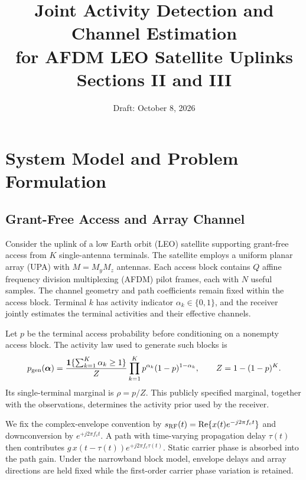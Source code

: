 \documentclass[10pt,a4paper]{article}
\title{Joint Activity Detection and Channel Estimation\protect\\
for AFDM LEO Satellite Uplinks\protect\\[5pt]
\large Sections II and III}
\author{}
\date{Draft: October 8, 2026}
\newcommand{\relu}{\operatorname{Re}}
\begin{document}
\maketitle
\vspace{-7mm}
\setcounter{section}{1}

\section{System Model and Problem Formulation}
\label{sec:system}

\subsection{Grant-Free Access and Array Channel}

Consider the uplink of a low Earth orbit (LEO) satellite supporting grant-free
access from $K$ single-antenna terminals. The satellite employs a uniform
planar array (UPA) with $M=M_yM_z$ antennas. Each access block contains $Q$
affine frequency division multiplexing (AFDM) pilot frames, each with $N$
useful samples. The channel geometry and path coefficients remain fixed
within the access block. Terminal $k$ has activity indicator
$\alpha_k\in\{0,1\}$, and the receiver jointly estimates the terminal
activities and their effective channels.

Let $p$ be the terminal access probability before conditioning on a nonempty
access block. The activity law used to generate such blocks is
\begin{equation}
 p_{\rm gen}(\bm\alpha)=
 \frac{\mathbf{1}\{\sum_{k=1}^{K}\alpha_k\geq1\}}{Z}
 \prod_{k=1}^{K}p^{\alpha_k}(1-p)^{1-\alpha_k},
 \qquad Z=1-(1-p)^K.
 \label{eq:activity-generation}
\end{equation}
Its single-terminal marginal is $\rho=p/Z$. This publicly specified
marginal, together with the observations, determines the activity prior
used by the receiver.

We fix the complex-envelope convention by
$s_{\rm RF}(t)=\relu\{x(t)e^{-j2\pi f_ct}\}$ and downconversion by
$e^{+j2\pi f_ct}$. A path with time-varying propagation delay $\tau(t)$
then contributes $g\,x(t-\tau(t))e^{+j2\pi f_c\tau(t)}$. Static carrier
phase is absorbed into the path gain. Under the narrowband block model,
envelope delays and array directions are held fixed while the first-order
carrier phase variation is retained.
\end{document}
